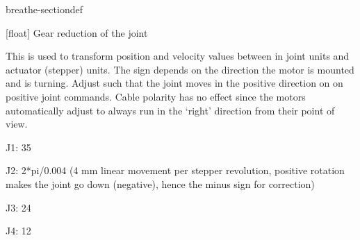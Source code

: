 \documentclass[letterpaper,10pt,english]{sphinxmanual}
\begin{document}
\begin{fulllineitems}
\begin{fulllineitems}
\begin{sphinxuseclass}{breathe-sectiondef}
\begin{fulllineitems}
\label{\detokenize{code/bioscara_hardware_interfaces/index:_CPPv4N28bioscara_hardware_interfaces28bioscara_hardware_interfaces28BioscaraArmHardwareInterface14joint_config_t9reductionE}}\label{\detokenize{code/bioscara_hardware_interfaces/index:_CPPv3N28bioscara_hardware_interfaces28bioscara_hardware_interfaces28BioscaraArmHardwareInterface14joint_config_t9reductionE}}\label{\detokenize{code/bioscara_hardware_interfaces/index:_CPPv2N28bioscara_hardware_interfaces28bioscara_hardware_interfaces28BioscaraArmHardwareInterface14joint_config_t9reductionE}}\label{\detokenize{code/bioscara_hardware_interfaces/index:bioscara_hardware_interfaces::bioscara_hardware_interfaces::BioscaraArmHardwareInterface::joint_config_t::reduction__float}}
\pysigstartsignatures
\pysigstartmultiline
\pysigline
{\label{\detokenize{code/bioscara_hardware_interfaces/index:structbioscara__hardware__interfaces_1_1BioscaraArmHardwareInterface_1_1joint__config__t_1a0a84f3e1768fbfb9da1952812a8ea644}}}
\pysigstopmultiline
\pysigstopsignatures
\sphinxAtStartPar
{[}float{]} Gear reduction of the joint 

\sphinxAtStartPar

\sphinxAtStartPar
This is used to transform position and velocity values between in joint units and actuator (stepper) units. The sign depends on the direction the motor is mounted and is turning. Adjust such that the joint moves in the positive direction on on positive joint commands. Cable polarity has no effect since the motors automatically adjust to always run in the ‘right’ direction from their point of view.

\sphinxAtStartPar
J1: 35

\sphinxAtStartPar
J2: \sphinxhyphen{}2*pi/0.004 (4 mm linear movement per stepper revolution, positive rotation makes the joint go down (negative), hence the minus sign for correction)

\sphinxAtStartPar
J3: 24

J4: 12 

\end{fulllineitems}



\end{sphinxuseclass}
\end{fulllineitems}
\end{fulllineitems}
\end{document}
